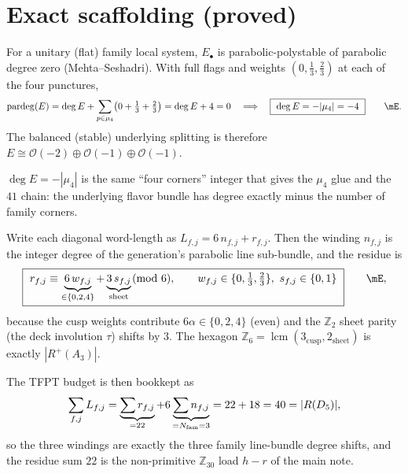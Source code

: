 \section{Exact scaffolding (proved)}
\begin{proposition}
For a unitary (flat) family local system, $E_\bullet$ is parabolic-polystable of parabolic degree zero
(Mehta--Seshadri). With full flags and weights $(0,\tfrac13,\tfrac23)$ at each of the four punctures,
\begin{equation}
  \pardeg(E)=\deg E+\sum_{p\in\mu_4}\bigl(0+\tfrac13+\tfrac23\bigr)=\deg E+4=0
  \quad\Longrightarrow\quad \boxed{\ \deg E=-|\mu_4|=-4\ }\qquad\mE .
\end{equation}
The balanced (stable) underlying splitting is therefore $E\cong\mathcal O(-2)\oplus\mathcal O(-1)\oplus\mathcal O(-1)$. \mE
\end{proposition}

\begin{remark}
$\deg E=-|\mu_4|$ is the same ``four corners'' integer that gives the $\mu_4$ glue and the $41$ chain:
the underlying flavor bundle has degree exactly minus the number of family corners.
\end{remark}

\begin{proposition}
Write each diagonal word-length as $L_{f,j}=6\,n_{f,j}+r_{f,j}$. Then the winding $n_{f,j}$ is the
integer degree of the generation's parabolic line sub-bundle, and the residue is
\begin{equation}
  \boxed{\ r_{f,j}\equiv \underbrace{6\,w_{f,j}}_{\in\{0,2,4\}}+\underbrace{3\,s_{f,j}}_{\text{sheet}}\!\!\pmod 6,\qquad
  w_{f,j}\in\{0,\tfrac13,\tfrac23\},\ s_{f,j}\in\{0,1\}\ }\qquad\mE ,
\end{equation}
because the cusp weights contribute $6\alpha\in\{0,2,4\}$ (even) and the $\mathbb Z_2$ sheet parity (the
deck involution $\tau$) shifts by $3$. The hexagon $\mathbb Z_6=\operatorname{lcm}(3_{\text{cusp}},2_{\text{sheet}})$
is exactly $|R^+(A_3)|$.
\end{proposition}

\noindent The TFPT budget is then bookkept as
\begin{equation}
  \sum_{f,j}L_{f,j}=\underbrace{\sum r_{f,j}}_{=22}+6\underbrace{\sum n_{f,j}}_{=N_{\mathrm{fam}}=3}=22+18=40=|R(D_5)| ,
\end{equation}
so the three windings are exactly the three family line-bundle degree shifts, and the residue sum $22$
is the non-primitive $\mathbb Z_{30}$ load $h-r$ of the main note. \mE

